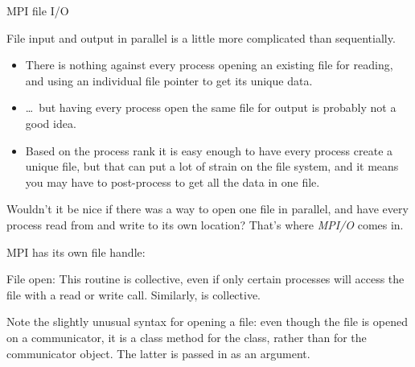 
 {MPI file I/O}

File input and output in parallel is a little more complicated than
sequentially.
\begin{itemize}
\item There is nothing against every process opening an existing file
  for reading, and using an individual file pointer to get its unique
  data.
\item \ldots~but having every process open the same file for output is
  probably not a good idea.
\item Based on the process rank it is easy enough to have
  every process create a unique file, but that can put a lot of strain
  on the file system, and it means you may have to post-process 
  to get all the data in one file.
\end{itemize}

Wouldn't it be nice if there was a way to open one file in parallel,
and have every process read from and write to its own location? That's
where \emph{MPI/O} comes in.

MPI has its own file handle:

File open:
This routine is collective, even if only certain processes will access
the file with a read or write call.
Similarly,  is collective.

\begin{pythonnote}
  Note the slightly unusual syntax for opening a file: even though the file is
  opened on a communicator, it is a class method for the 
  class, rather than for the communicator object. The latter is passed
  in as an argument.
\end{pythonnote}


